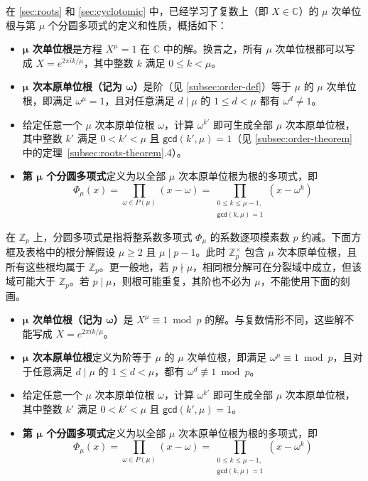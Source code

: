 在 \autoref{sec:roots} 和 \autoref{sec:cyclotomic} 中，已经学习了复数上（即 $X \in \mathbb{C}$）的 $\mu$ 次单位根与第 $\mu$ 个分圆多项式的定义和性质，概括如下：

\begin{itemize}
\item \textbf{$\bm \mu$ 次单位根}是方程 $X^\mu = 1$ 在 $\mathbb{C}$ 中的解。换言之，所有 $\mu$ 次单位根都可以写成 $X = e^{2 \pi i k / \mu}$，其中整数 $k$ 满足 $0 \le k < \mu$。
\item \textbf{$\bm \mu$ 次本原单位根（记为 $\bm \omega$）}是阶（见 \autoref{subsec:order-def}）等于 $\mu$ 的 $\mu$ 次单位根，即满足 $\omega^{\mu} = 1$，且对任意满足 $d \mid \mu$ 的 $1 \le d < \mu$ 都有 $\omega^d \neq 1$。
\item 给定任意一个 $\mu$ 次本原单位根 $\omega$，计算 $\omega^{k'}$ 即可生成全部 $\mu$ 次本原单位根，其中整数 $k'$ 满足 $0 < k' < \mu$ 且 $\textsf{gcd}(k', \mu) = 1$（见 \autoref{subsec:order-theorem} 中的定理~\ref*{subsec:roots-theorem}.4）。
\item \textbf{第 $\bm \mu$ 个分圆多项式}定义为以全部 $\mu$ 次本原单位根为根的多项式，即 \[ \Phi_{\mu}(x) = \prod_{\omega \in P({\mu})} (x - \omega) = \prod_{\substack{0 \leq k \leq {\mu}-1,\\ \textsf{gcd}(k, {\mu}) = 1}} (x - \omega^k) \]
\end{itemize}

在 $\mathbb{Z}_p$ 上，分圆多项式是指将整系数多项式 $\Phi_\mu$ 的系数逐项模素数 $p$ 约减。下面方框及表格中的根分解假设 $\mu\ge2$ 且 $\mu\mid p-1$。此时 $\mathbb{Z}_p^\times$ 包含 $\mu$ 次本原单位根，且所有这些根均属于 $\mathbb{Z}_p$。更一般地，若 $p\nmid\mu$，相同根分解可在分裂域中成立，但该域可能大于 $\mathbb{Z}_p$。若 $p\mid\mu$，则根可能重复，其阶也不必为 $\mu$，不能使用下面的刻画。

\begin{tcolorbox}[title={\textbf{\tboxdef{\ref*{sec:cyclotomic-polynomial-integer-ring}} 环 $\mathbb{Z}_p$ 上的单位根与分圆多项式}}]


\begin{itemize}
\item \textbf{$\bm \mu$ 次单位根（记为 $\bm \omega$）}是 $X^\mu \equiv 1 \bmod p$ 的解。与复数情形不同，这些解不能写成 $X = e^{2 \pi i k / \mu}$。
\item \textbf{$\bm \mu$ 次本原单位根}定义为阶等于 $\mu$ 的 $\mu$ 次单位根，即满足 $\omega^{\mu} \equiv 1 \bmod p$，且对于任意满足 $d \mid \mu$ 的 $1 \le d < \mu$，都有 $\omega^d \not\equiv 1 \bmod p$。
\item 给定任意一个 $\mu$ 次本原单位根 $\omega$，计算 $\omega^{k'}$ 即可生成全部 $\mu$ 次本原单位根，其中整数 $k'$ 满足 $0 < k' < \mu$ 且 $\textsf{gcd}(k', \mu) = 1$。
\item \textbf{第 $\bm \mu$ 个分圆多项式}定义为以全部 $\mu$ 次本原单位根为根的多项式，即 \[ \Phi_{\mu}(x) = \prod_{\omega \in P({\mu})} (x - \omega) = \prod_{\substack{0 \leq k \leq {\mu}-1,\\ \textsf{gcd}(k, {\mu}) = 1}} (x - \omega^k) \]
\end{itemize}

\end{tcolorbox}

